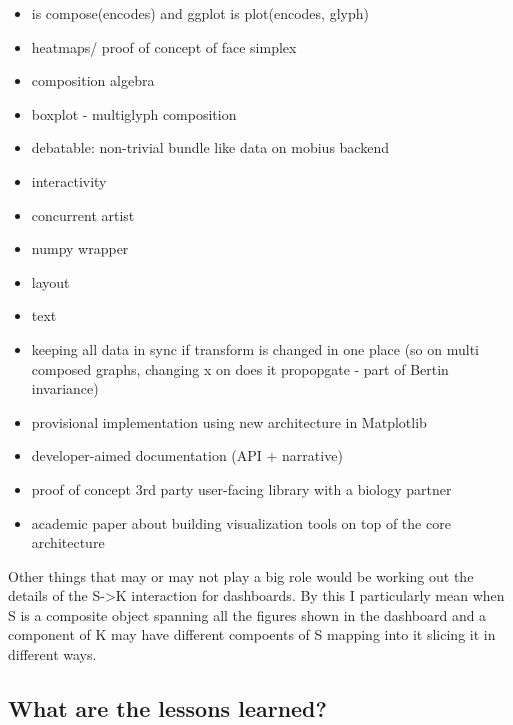 \documentclass[../main.tex]{subfiles}
\begin{document}
\begin{itemize}
    \item is compose(encodes) and ggplot is plot(encodes, glyph)
    \item heatmaps/ proof of concept of face simplex
    \item composition algebra
    \item boxplot - multiglyph composition
    \item debatable: non-trivial bundle like data on mobius backend
    \item interactivity 
    \item concurrent artist
    \item numpy wrapper
    \item layout
    \item text
    \item keeping all data in sync if transform is changed in one place (so on multi composed graphs, changing x on does it propopgate - part of Bertin invariance)
\end{itemize}
\begin{itemize}
    \item provisional implementation using new architecture in Matplotlib
    \item developer-aimed documentation (API + narrative)
    \item proof of concept 3rd party user-facing library with a biology partner
    \item academic paper about building visualization tools on top of the core architecture
\end{itemize}

Other things that may or may not play a big role would be working out the details of the S->K interaction for dashboards. By this I particularly mean when S is a composite object spanning all the figures shown in the dashboard and a component of K may have different compoents of S mapping into it slicing it in different ways.
\subsection{What are the lessons learned?}
\end{document}

